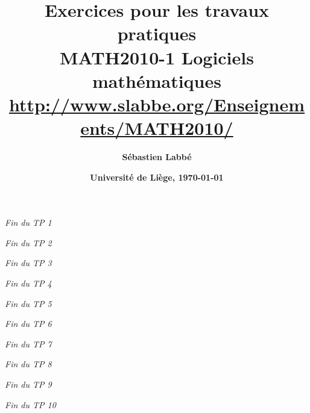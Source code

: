 

\usepackage{titling}
\setlength{\droptitle}{-6em}   %

\thispagestyle{empty}
\title{\sffamily\bfseries
    Exercices pour les travaux pratiques\\[3mm]
    MATH2010-1 Logiciels mathématiques\\[2mm]
    \normalsize\url{http://www.slabbe.org/Enseignements/MATH2010/}}
\author{\sffamily\bfseries Sébastien Labbé}
\date{\sffamily\bfseries Université de Liège, \today}



\maketitle




\hfill{\it Fin du TP 1}


\hfill{\it Fin du TP 2}



\hfill{\it Fin du TP 3}


\hfill{\it Fin du TP 4}

\hfill{\it Fin du TP 5}

\hfill{\it Fin du TP 6}



\hfill{\it Fin du TP 7}


\hfill{\it Fin du TP 8}



\hfill{\it Fin du TP 9}

\hfill{\it Fin du TP 10}

